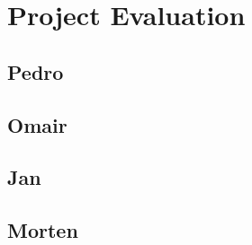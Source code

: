 \newpage
\chapter{Project Evaluation}
\label{chap:evaluation}

\section{Pedro}

\section{Omair}

\section{Jan}

\section{Morten}